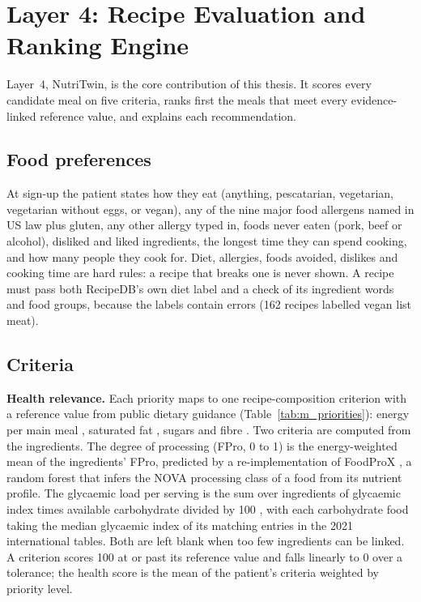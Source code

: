 \section{Layer 4: Recipe Evaluation and Ranking Engine}
\label{sec:m_layer4}

Layer~4, NutriTwin, is the core contribution of this thesis. It scores every
candidate meal on five criteria, ranks first the meals that meet every
evidence-linked reference value, and explains each recommendation.

\subsection{Food preferences}

At sign-up the patient states how they eat (anything, pescatarian,
vegetarian, vegetarian without eggs, or vegan), any of the nine major food
allergens named in US law plus gluten, any other allergy typed in, foods never
eaten (pork, beef or alcohol), disliked and liked ingredients, the longest
time they can spend cooking, and how many people they cook for. Diet,
allergies, foods avoided, dislikes and cooking time are hard rules: a recipe
that breaks one is never shown. A recipe must pass both RecipeDB's own diet
label and a check of its ingredient words and food groups, because the labels
contain errors (162 recipes labelled vegan list meat).

\subsection{Criteria}

\textbf{Health relevance.} Each priority maps to one recipe-composition
criterion with a reference value from public dietary guidance
(Table~\ref{tab:m_priorities}): energy per main meal \cite{phe2018calories},
saturated fat \cite{who2023satfat,dga2020}, sugars \cite{who2015sugars} and
fibre \cite{dga2020}. Two criteria are computed from the ingredients. The
degree of processing (FPro, 0 to 1) is the energy-weighted mean of the
ingredients' FPro, predicted by a re-implementation of FoodProX
\cite{menichetti2023processing}, a random forest that infers the NOVA
processing class of a food from its nutrient profile. The glycaemic load per
serving is the sum over ingredients of glycaemic index times available
carbohydrate divided by 100 \cite{atkinson2021gi}, with each carbohydrate food
taking the median glycaemic index of its matching entries in the 2021
international tables. Both are left blank when too few ingredients can be
linked. A criterion scores 100 at or past its reference value and falls
linearly to 0 over a tolerance; the health score is the mean of the patient's
criteria weighted by priority level.

